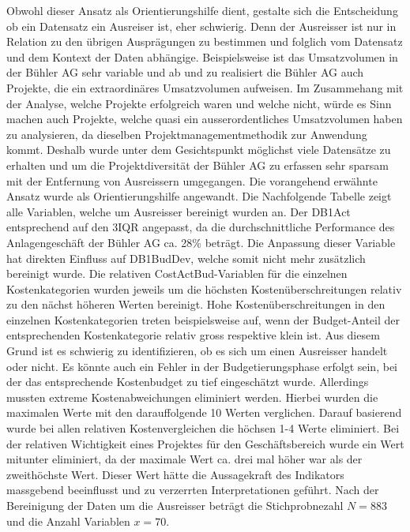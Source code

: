 \documentclass[11pt]{article}
\begin{document}
Obwohl dieser Ansatz als Orientierungshilfe dient, gestalte sich die Entscheidung ob ein Datensatz ein Ausreiser ist, eher schwierig. Denn der Ausreisser ist nur in Relation zu den übrigen Ausprägungen zu bestimmen und folglich vom Datensatz und dem Kontext der Daten abhängige. Beispielsweise ist das Umsatzvolumen in der Bühler AG sehr variable und ab und zu realisiert die Bühler AG auch Projekte, die ein extraordinäres Umsatzvolumen aufweisen. Im Zusammehang mit der Analyse, welche Projekte erfolgreich waren und welche nicht, würde es Sinn machen auch Projekte, welche quasi ein ausserordentliches Umsatzvolumen haben zu analysieren, da dieselben Projektmanagementmethodik zur Anwendung kommt. Deshalb wurde unter dem Gesichtspunkt möglichst viele Datensätze zu erhalten und um die Projektdiversität der Bühler AG zu erfassen sehr sparsam mit der Entfernung von Ausreissern umgegangen. Die vorangehend erwähnte Ansatz wurde als Orientierungshilfe angewandt. Die Nachfolgende Tabelle zeigt alle Variablen, welche um Ausreisser bereinigt wurden an. Der DB1Act entsprechend auf den 3IQR angepasst, da die durchschnittliche Performance des Anlagengeschäft der Bühler AG ca. 28\% beträgt. Die Anpassung dieser Variable hat direkten Einfluss auf DB1BudDev, welche somit nicht mehr zusätzlich bereinigt wurde. Die relativen CostActBud-Variablen für die einzelnen Kostenkategorien wurden jeweils um die höchsten Kostenüberschreitungen relativ zu den nächst höheren Werten bereinigt. Hohe Kostenüberschreitungen in den einzelnen Kostenkategorien treten beispielsweise auf, wenn der Budget-Anteil der entsprechenden Kostenkategorie relativ gross respektive klein ist. Aus diesem Grund ist es schwierig zu identifizieren, ob es sich um einen Ausreisser handelt oder nicht. Es könnte auch ein Fehler in der Budgetierungsphase erfolgt sein, bei der das entsprechende Kostenbudget zu tief eingeschätzt wurde. Allerdings mussten extreme Kostenabweichungen eliminiert werden. Hierbei wurden die maximalen Werte mit den darauffolgende 10 Werten verglichen. Darauf basierend wurde bei allen relativen Kostenvergleichen die höchsen 1-4 Werte eliminiert. Bei der relativen Wichtigkeit eines Projektes für den Geschäftsbereich wurde ein Wert mitunter eliminiert, da der maximale Wert ca. drei mal höher war als der zweithöchste Wert. Dieser Wert hätte die Aussagekraft des Indikators massgebend beeinflusst und zu verzerrten Interpretationen geführt. Nach der Bereinigung der Daten um die Ausreisser beträgt die Stichprobnezahl $N = 883 $ und die Anzahl Variablen $ x = 70$.
\end{document}
